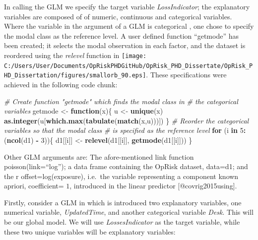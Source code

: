 \documentclass[]{article}
\newenvironment{Shaded}{\begin{snugshade}}{\end{snugshade}}
\newcommand{\KeywordTok}[1]{\textcolor[rgb]{0.13,0.29,0.53}{\textbf{#1}}}
\newcommand{\DecValTok}[1]{\textcolor[rgb]{0.00,0.00,0.81}{#1}}
\newcommand{\StringTok}[1]{\textcolor[rgb]{0.31,0.60,0.02}{#1}}
\newcommand{\CommentTok}[1]{\textcolor[rgb]{0.56,0.35,0.01}{\textit{#1}}}
\newcommand{\ControlFlowTok}[1]{\textcolor[rgb]{0.13,0.29,0.53}{\textbf{#1}}}
\newcommand{\OperatorTok}[1]{\textcolor[rgb]{0.81,0.36,0.00}{\textbf{#1}}}
\newcommand{\NormalTok}[1]{#1}
\begin{document}
\singlespacing

\doublespacing

In calling the GLM we specify the target variable \emph{LossIndicator};
the explanatory variables are composed of of numeric, continuous and
categorical variables. Where the variable in the argument of a GLM is
categorical , one chose to specify the modal class as the reference
level. A user defined function ``getmode'' has been created; it selects
the modal observation in each factor, and the dataset is reordered using
the \emph{relevel} function in
\texttt{[image: C:/Users/User/Documents/OpRiskPHDGitHub/OpRisk\_PHD\_Dissertate/OpRisk\_PHD\_Dissertation/figures/smallorb\_90.eps]}.
These specifications were achieved in the following code chunk:

\singlespacing

\begin{Shaded}
\begin{Highlighting}[]
\CommentTok{# Create function "getmode" which finds the modal class in}
\CommentTok{# the categorical variables}
\NormalTok{getmode <-}\StringTok{ }\ControlFlowTok{function}\NormalTok{(x)\{}
\NormalTok{  u <-}\StringTok{ }\KeywordTok{unique}\NormalTok{(x)}
  \KeywordTok{as.integer}\NormalTok{(u[}\KeywordTok{which.max}\NormalTok{(}\KeywordTok{tabulate}\NormalTok{(}\KeywordTok{match}\NormalTok{(x,u)))])}
\NormalTok{\}}
\CommentTok{# Reorder the categorical variables so that the modal class }
\CommentTok{# is specified as the reference level}
\ControlFlowTok{for}\NormalTok{ (i }\ControlFlowTok{in} \DecValTok{5}\OperatorTok{:}\NormalTok{(}\KeywordTok{ncol}\NormalTok{(d1) }\OperatorTok{-}\StringTok{ }\DecValTok{3}\NormalTok{))\{}
\NormalTok{     d1[[i]] <-}\StringTok{ }\KeywordTok{relevel}\NormalTok{(d1[[i]], }\KeywordTok{getmode}\NormalTok{(d1[[i]]))}
\NormalTok{\}}
\end{Highlighting}
\end{Shaded}

\doublespacing

Other GLM arguments are: The afore-mentioned link function
poisson(link=``log''); a data frame containing the OpRisk dataset,
data=d1; and the r offset=log(exposure), i.e.~the variable representing
a component known apriori, coefficient= \(1\), introduced in the linear
predictor {[}@covrig2015using{]}.\medskip

Firstly, consider a GLM in which is introduced two explanatory
variables, one numerical variable, \emph{UpdatedTime}, and another
categorical variable \emph{Desk}. This will be our global model. We will
use \emph{LossesIndicator} as the target variable, while these two
unique variables will be explanatory variables:
\end{document}
